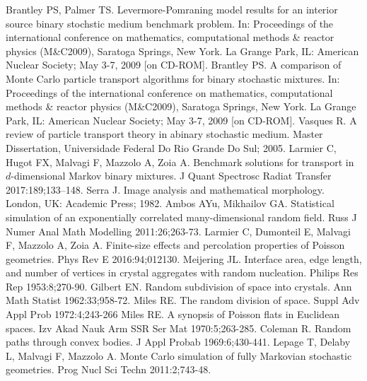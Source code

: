\documentclass[final,authoryear,5p,times,twocolumn]{elsarticle}
\begin{document}
\begin{thebibliography}{10}
 Brantley PS, Palmer TS. Levermore-Pomraning model results for an interior source binary stochstic medium benchmark problem. In: Proceedings of the international conference on mathematics, computational methods \& reactor physics (M\&C2009), Saratoga Springs, New York. La Grange Park, IL: American Nuclear Society; May 3-7, 2009 [on CD-ROM].
 Brantley PS. A comparison of Monte Carlo particle transport algorithms for binary stochastic mixtures. In: Proceedings of the international conference on mathematics, computational methods \& reactor physics (M\&C2009), Saratoga Springs, New York. La Grange Park, IL: American Nuclear Society; May 3-7, 2009 [on CD-ROM].
 Vasques R. A review of particle transport theory in abinary stochastic medium. Master Dissertation, Universidade Federal Do Rio Grande Do Sul; 2005.
 Larmier C, Hugot FX, Malvagi F, Mazzolo A, Zoia A. Benchmark solutions for transport in $d$-dimensional Markov binary mixtures. J Quant Spectrosc Radiat Transfer 2017:189;133–148.
 Serra J. Image analysis and mathematical morphology. London, UK: Academic Press; 1982.
 Ambos AYu, Mikhailov GA. Statistical simulation of an exponentially correlated many-dimensional random field. Russ J Numer Anal Math Modelling 2011:26;263-73.
 Larmier C, Dumonteil E, Malvagi F, Mazzolo A, Zoia A. Finite-size effects and percolation properties of Poisson geometries. Phys Rev E 2016:94;012130.
 Meijering JL. Interface area, edge length, and number of vertices in crystal aggregates with random nucleation. Philips Res Rep 1953:8;270-90.
 Gilbert EN. Random subdivision of space into crystals. Ann Math Statist 1962:33;958-72.
 Miles RE. The random division of space. Suppl Adv Appl Prob 1972:4;243-266 %
 Miles RE. A synopsis of Poisson flats in Euclidean spaces. Izv Akad Nauk Arm SSR Ser Mat 1970:5;263-285.
 Coleman R. Random paths through convex bodies. J Appl Probab 1969:6;430-441.
 Lepage T, Delaby L, Malvagi F, Mazzolo A. Monte Carlo simulation of fully Markovian stochastic geometries. Prog Nucl Sci Techn 2011:2;743-48.

\end{thebibliography}
\end{document}
